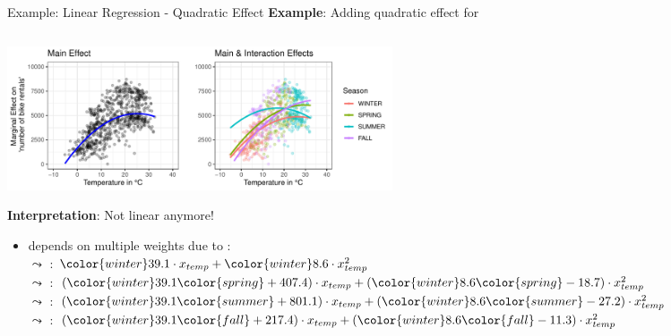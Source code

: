 \documentclass[11pt,compress,t,notes=noshow, aspectratio=169, xcolor=table]{beamer}
\begin{document}
\begin{frame}{Example: Linear Regression - Quadratic Effect}
\textbf{Example}: Adding quadratic effect for  
\begin{columns}[T, totalwidth=\linewidth]
\begin{column}{0.65\linewidth}
\includegraphics[width=0.5\textwidth, trim=0cm 0.1cm 10.4cm 0cm, clip]{figure/poly_main_vs_interaction_effects.pdf}

\textbf{Interpretation}: Not linear anymore!
\begin{itemize}
    \item<2>[$\leadsto$]  depends on multiple weights due to :\\
    $\leadsto$ : ${\color{winter}39.1} \cdot x_{temp} + {\color{winter}8.6} \cdot x_{temp}^2$ \\
    $\leadsto$ : 
    $({\color{winter}39.1} {\color{spring}+407.4}) \cdot x_{temp} + ({\color{winter}8.6} {\color{spring} - 18.7}) \cdot x_{temp}^2$ \\
    $\leadsto$ : $({\color{winter}39.1}  {\color{summer}+801.1}) \cdot x_{temp} + ({\color{winter}8.6} {\color{summer} - 27.2}) \cdot x_{temp}^2$  \\
    $\leadsto$ : $({\color{winter}39.1}  {\color{fall}+217.4}) \cdot x_{temp} + ({\color{winter}8.6} {\color{fall} - 11.3}) \cdot x_{temp}^2$ 
\end{itemize}


\end{column}
\end{columns}
\end{frame}
\end{document}
